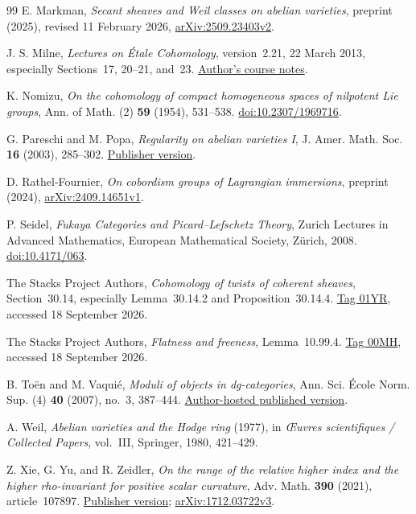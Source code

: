 \begin{thebibliography}{99}
E. Markman,
\emph{Secant sheaves and Weil classes on abelian varieties},
preprint (2025), revised 11 February 2026,
\href{https://arxiv.org/abs/2509.23403v2}{arXiv:2509.23403v2}.

J. S. Milne,
\emph{Lectures on \'Etale Cohomology}, version~2.21, 22 March 2013,
especially Sections~17, 20--21, and~23.
\href{https://www.jmilne.org/math/CourseNotes/LEC.pdf}{Author's course notes}.

K. Nomizu,
\emph{On the cohomology of compact homogeneous spaces of nilpotent Lie groups},
Ann. of Math. (2) \textbf{59} (1954), 531--538.
\href{https://doi.org/10.2307/1969716}{doi:10.2307/1969716}.

G. Pareschi and M. Popa,
\emph{Regularity on abelian varieties I},
J. Amer. Math. Soc. \textbf{16} (2003), 285--302.
\href{https://doi.org/10.1090/S0894-0347-02-00414-9}{Publisher version}.

D. Rathel-Fournier,
\emph{On cobordism groups of Lagrangian immersions},
preprint (2024), \href{https://arxiv.org/abs/2409.14651v1}{arXiv:2409.14651v1}.

P. Seidel,
\emph{Fukaya Categories and Picard--Lefschetz Theory},
Zurich Lectures in Advanced Mathematics,
European Mathematical Society, Z\"urich, 2008.
\href{https://doi.org/10.4171/063}{doi:10.4171/063}.

The Stacks Project Authors,
\emph{Cohomology of twists of coherent sheaves},
Section~30.14, especially Lemma~30.14.2 and Proposition~30.14.4.
\href{https://stacks.math.columbia.edu/tag/01YR}{Tag 01YR},
accessed 18 September 2026.

The Stacks Project Authors,
\emph{Flatness and freeness}, Lemma~10.99.4.
\href{https://stacks.math.columbia.edu/tag/00MH}{Tag 00MH},
accessed 18 September 2026.

B. To\"en and M. Vaqui\'e,
\emph{Moduli of objects in dg-categories},
Ann. Sci. \'Ecole Norm. Sup. (4) \textbf{40} (2007), no.~3, 387--444.
\href{https://www.math.univ-toulouse.fr/~vaquie/marque/vaquie_AnnEns40.pdf}
{Author-hosted published version}.

A. Weil,
\emph{Abelian varieties and the Hodge ring} (1977),
in \emph{\OE uvres scientifiques / Collected Papers}, vol.~III,
Springer, 1980, 421--429.

Z. Xie, G. Yu, and R. Zeidler,
\emph{On the range of the relative higher index and the higher
rho-invariant for positive scalar curvature},
Adv. Math. \textbf{390} (2021), article~107897.
\href{https://doi.org/10.1016/j.aim.2021.107897}{Publisher version};
\href{https://arxiv.org/abs/1712.03722v3}{arXiv:1712.03722v3}.

\end{thebibliography}
